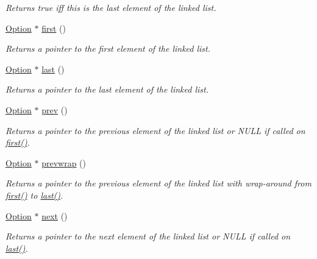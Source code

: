\begin{DoxyCompactItemize}
\begin{DoxyCompactList}\small\item\em Returns true iff this is the last element of the linked list. \end{DoxyCompactList}\item 
\hyperlink{classoption_1_1Option}{Option} $\ast$ \hyperlink{classoption_1_1Option_abb4e13cd7c90999c8a6b1f871cece283}{first} ()
\begin{DoxyCompactList}\small\item\em Returns a pointer to the first element of the linked list. \end{DoxyCompactList}\item 
\hyperlink{classoption_1_1Option}{Option} $\ast$ \hyperlink{classoption_1_1Option_afe2aff68191e55b59c53fac3dbbcd7c3}{last} ()
\begin{DoxyCompactList}\small\item\em Returns a pointer to the last element of the linked list. \end{DoxyCompactList}\item 
\hyperlink{classoption_1_1Option}{Option} $\ast$ \hyperlink{classoption_1_1Option_a4d12001a91b0b35cf47437d0c60d2b52}{prev} ()
\begin{DoxyCompactList}\small\item\em Returns a pointer to the previous element of the linked list or N\+U\+LL if called on \hyperlink{classoption_1_1Option_abb4e13cd7c90999c8a6b1f871cece283}{first()}. \end{DoxyCompactList}\item 
\hyperlink{classoption_1_1Option}{Option} $\ast$ \hyperlink{classoption_1_1Option_a1226e45dc2de30f269b2aff1784bbee7}{prevwrap} ()
\begin{DoxyCompactList}\small\item\em Returns a pointer to the previous element of the linked list with wrap-\/around from \hyperlink{classoption_1_1Option_abb4e13cd7c90999c8a6b1f871cece283}{first()} to \hyperlink{classoption_1_1Option_afe2aff68191e55b59c53fac3dbbcd7c3}{last()}. \end{DoxyCompactList}\item 
\hyperlink{classoption_1_1Option}{Option} $\ast$ \hyperlink{classoption_1_1Option_a59ae9aed505f4d410633bb36478a32be}{next} ()
\begin{DoxyCompactList}\small\item\em Returns a pointer to the next element of the linked list or N\+U\+LL if called on \hyperlink{classoption_1_1Option_afe2aff68191e55b59c53fac3dbbcd7c3}{last()}. \end{DoxyCompactList}\item 

\end{DoxyCompactItemize}
